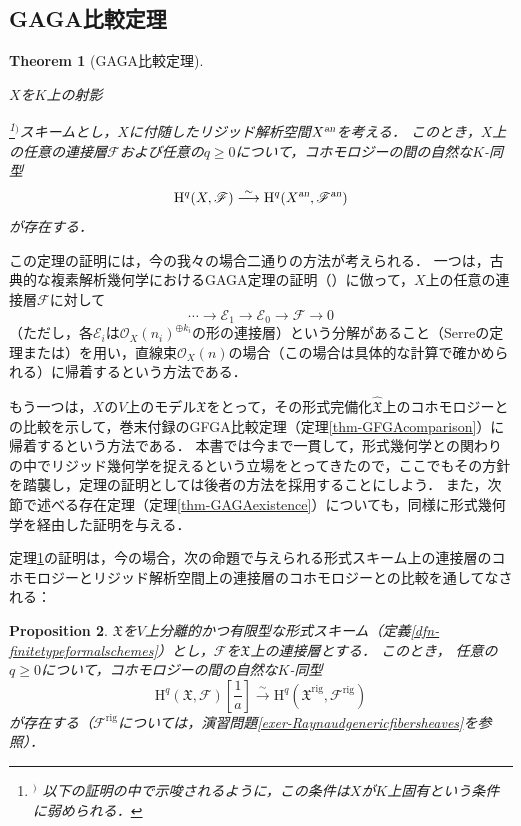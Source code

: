 \documentclass[a4paper,12pt, dvipdfmx]{jsbook}
\def\O{\mathscr{O}}
\def\rig{\mathop{\mathrm{rig}}\nolimits}
\def\H{\mathrm{H}}
\def\an{\textsl{an}}
\theoremstyle{plain}
\newtheorem{thm}{\bfseries Theorem}[section]
\newtheorem{prop}[thm]{\bfseries Proposition}
\theoremstyle{definition}
\newcounter{chushaku}
\def\chu#1{\addtocounter{chushaku}{1}\footnote[\value{chushaku}]{${}^)$ #1}${}^)$}
\begin{document}
\subsection{GAGA比較定理}\label{sub-GAGAcomparison}
\begin{thm}[GAGA比較定理]\label{thm-GAGAcomparison}{\rm 
$X$を$K$上の射影\chu{以下の証明の中で示唆されるように，この条件は$X$が$K$上固有という条件に弱められる．}スキームとし，$X$に付随したリジッド解析空間$X^{\an}$を考える．
このとき，$X$上の任意の連接層$\mathscr{F}$および任意の$q\geq 0$について，コホモロジーの間の自然な$K$-同型
$$
\H^q(X,\mathscr{F})\stackrel{\sim}{\longrightarrow}\H^q(X^{\an},\mathscr{F}^{\an})
$$
が存在する．}
\end{thm}

この定理の証明には，今の我々の場合二通りの方法が考えられる．
一つは，古典的な複素解析幾何学におけるGAGA定理の証明（\cite[\S13]{Ser2}）に倣って，$X$上の任意の連接層$\mathscr{F}$に対して
$$
\cdots\longrightarrow\mathscr{E}_1\longrightarrow\mathscr{E}_0\longrightarrow\mathscr{F}\longrightarrow 0
$$
（ただし，各$\mathscr{E}_i$は$\O_X(n_i)^{\oplus k_i}$の形の連接層）という分解があること（Serreの定理\cite[\S55]{Ser1}または\cite[Chap.\ II, Theorem 5.17]{Hart2}）を用い，直線束$\O_X(n)$の場合（この場合は具体的な計算で確かめられる）に帰着するという方法である．

もう一つは，$X$の$V$上のモデル$\mathfrak{X}$をとって，その形式完備化$\widehat{\mathfrak{X}}$上のコホモロジーとの比較を示して，巻末付録のGFGA比較定理（定理\ref{thm-GFGAcomparison}）に帰着するという方法である．
本書では今まで一貫して，形式幾何学との関わりの中でリジッド幾何学を捉えるという立場をとってきたので，ここでもその方針を踏襲し，定理の証明としては後者の方法を採用することにしよう．
また，次節で述べる存在定理（定理\ref{thm-GAGAexistence}）についても，同様に形式幾何学を経由した証明を与える．

定理{\rm \ref{thm-GAGAcomparison}}の証明は，今の場合，次の命題で与えられる形式スキーム上の連接層のコホモロジーとリジッド解析空間上の連接層のコホモロジーとの比較を通してなされる：
\begin{prop}\label{prop-GAGAcomparison}{\rm 
$\mathfrak{X}$を$V$上分離的かつ有限型な形式スキーム（定義\ref{dfn-finitetypeformalschemes}）とし，$\mathscr{F}$を$\mathfrak{X}$上の連接層とする．
このとき，
任意の$q\geq 0$について，コホモロジーの間の自然な$K$-同型
$$
\H^q(\mathfrak{X},\mathscr{F})[{\textstyle \frac{1}{a}}]\stackrel{\sim}{\longrightarrow}\H^q(\mathfrak{X}^{\rig},\mathscr{F}^{\rig})
$$
が存在する（$\mathscr{F}^{\rig}$については，演習問題\ref{exer-Raynaudgenericfibersheaves}を参照）．}
\end{prop}
\end{document}
